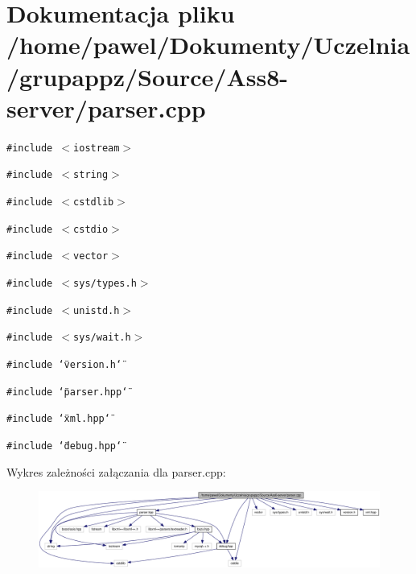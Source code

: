 \hypertarget{a00007}{
\section{Dokumentacja pliku /home/pawel/Dokumenty/Uczelnia/grupappz/Source/Ass8-server/parser.cpp}
\label{a00007}
}
{\tt \#include $<$iostream$>$}\par
{\tt \#include $<$string$>$}\par
{\tt \#include $<$cstdlib$>$}\par
{\tt \#include $<$cstdio$>$}\par
{\tt \#include $<$vector$>$}\par
{\tt \#include $<$sys/types.h$>$}\par
{\tt \#include $<$unistd.h$>$}\par
{\tt \#include $<$sys/wait.h$>$}\par
{\tt \#include \char`\"{}version.h\char`\"{}}\par
{\tt \#include \char`\"{}parser.hpp\char`\"{}}\par
{\tt \#include \char`\"{}xml.hpp\char`\"{}}\par
{\tt \#include \char`\"{}debug.hpp\char`\"{}}\par


Wykres zależności załączania dla parser.cpp:\nopagebreak
\begin{figure}[H]
\begin{center}
\leavevmode
\includegraphics[width=420pt]{a00029}
\end{center}
\end{figure}
